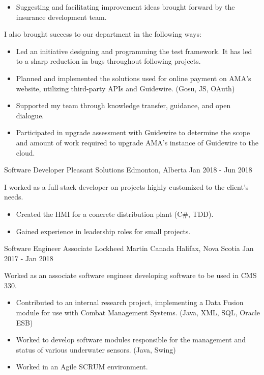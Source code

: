 \begin{cventries}
{\begin{itemize}
                \item Suggesting and facilitating improvement ideas brought forward by the insurance development team.
            \end{itemize}
            I also brought success to our department in the following ways:
            \begin{itemize}
                \item Led an initiative designing and programming the test framework.  It has led to a sharp reduction in bugs throughout following projects.
                \item Planned and implemented the solutions used for online payment on AMA’s website, utilizing third-party APIs and Guidewire. (Gosu, JS, OAuth)
                \item Supported my team through knowledge transfer, guidance, and open dialogue.
                \item Participated in upgrade assessment with Guidewire to determine the scope and amount of work required to upgrade AMA's instance of Guidewire to the cloud.
            \end{itemize}
        }
    \cventry
        {Software Developer}
        {Pleasant Solutions}
        {Edmonton, Alberta}
        {Jan 2018 - Jun 2018}
        {
            I worked as a full-stack developer on projects highly customized to the client’s needs.
            \begin{itemize}
                \item Created the HMI for a concrete distribution plant (C\#, TDD).
                \item Gained experience in leadership roles for small projects.
            \end{itemize}
        }
    \cventry
        {Software Engineer Associate}
        {Lockheed Martin Canada}
        {Halifax, Nova Scotia}
        {Jan 2017 - Jan 2018}
        {
            Worked as an associate software engineer developing software to be used in CMS 330.
            \begin{itemize}
                \item Contributed to an internal research project, implementing a Data Fusion module for use with Combat Management Systems. (Java, XML, SQL, Oracle ESB)
                \item Worked to develop software modules responsible for the management and status of various underwater sensors. (Java, Swing)
                \item Worked in an Agile SCRUM environment.

\end{itemize}}
\end{cventries}
